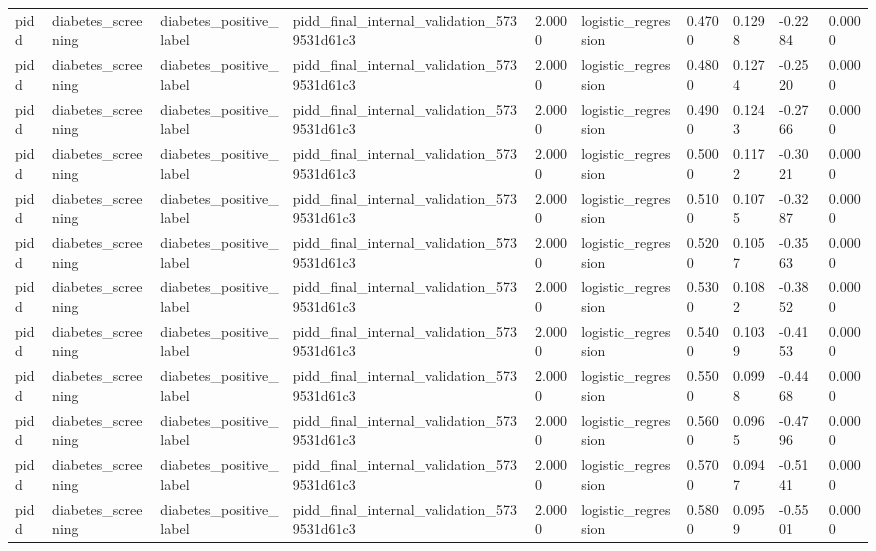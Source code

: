\begin{tabular}{llllllllll}
pidd & diabetes\_screening & diabetes\_positive\_label & pidd\_final\_internal\_validation\_5739531d61c3 & 2.0000 & logistic\_regression & 0.4700 & 0.1298 & -0.2284 & 0.0000 \\
pidd & diabetes\_screening & diabetes\_positive\_label & pidd\_final\_internal\_validation\_5739531d61c3 & 2.0000 & logistic\_regression & 0.4800 & 0.1274 & -0.2520 & 0.0000 \\
pidd & diabetes\_screening & diabetes\_positive\_label & pidd\_final\_internal\_validation\_5739531d61c3 & 2.0000 & logistic\_regression & 0.4900 & 0.1243 & -0.2766 & 0.0000 \\
pidd & diabetes\_screening & diabetes\_positive\_label & pidd\_final\_internal\_validation\_5739531d61c3 & 2.0000 & logistic\_regression & 0.5000 & 0.1172 & -0.3021 & 0.0000 \\
pidd & diabetes\_screening & diabetes\_positive\_label & pidd\_final\_internal\_validation\_5739531d61c3 & 2.0000 & logistic\_regression & 0.5100 & 0.1075 & -0.3287 & 0.0000 \\
pidd & diabetes\_screening & diabetes\_positive\_label & pidd\_final\_internal\_validation\_5739531d61c3 & 2.0000 & logistic\_regression & 0.5200 & 0.1057 & -0.3563 & 0.0000 \\
pidd & diabetes\_screening & diabetes\_positive\_label & pidd\_final\_internal\_validation\_5739531d61c3 & 2.0000 & logistic\_regression & 0.5300 & 0.1082 & -0.3852 & 0.0000 \\
pidd & diabetes\_screening & diabetes\_positive\_label & pidd\_final\_internal\_validation\_5739531d61c3 & 2.0000 & logistic\_regression & 0.5400 & 0.1039 & -0.4153 & 0.0000 \\
pidd & diabetes\_screening & diabetes\_positive\_label & pidd\_final\_internal\_validation\_5739531d61c3 & 2.0000 & logistic\_regression & 0.5500 & 0.0998 & -0.4468 & 0.0000 \\
pidd & diabetes\_screening & diabetes\_positive\_label & pidd\_final\_internal\_validation\_5739531d61c3 & 2.0000 & logistic\_regression & 0.5600 & 0.0965 & -0.4796 & 0.0000 \\
pidd & diabetes\_screening & diabetes\_positive\_label & pidd\_final\_internal\_validation\_5739531d61c3 & 2.0000 & logistic\_regression & 0.5700 & 0.0947 & -0.5141 & 0.0000 \\
pidd & diabetes\_screening & diabetes\_positive\_label & pidd\_final\_internal\_validation\_5739531d61c3 & 2.0000 & logistic\_regression & 0.5800 & 0.0959 & -0.5501 & 0.0000 \\

\end{tabular}

